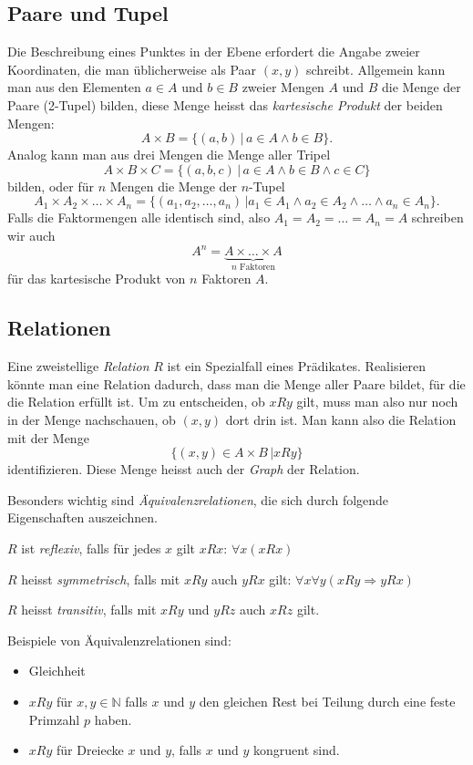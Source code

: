 \subsection{Paare und Tupel}
%
%
%
Die Beschreibung eines Punktes in der Ebene erfordert die Angabe zweier
Koordinaten, die man üblicherweise als Paar $(x,y)$ schreibt.
Allgemein
kann man aus den Elementen $a\in A$ und $b\in B$ zweier Mengen $A$ und $B$
die Menge der Paare (2-Tupel) bilden, diese Menge heisst das
{\em kartesische Produkt} der beiden Mengen:
\[
A\times B = \{(a,b)\,|\,a\in A\wedge b\in B\}.
\]
%
Analog kann man aus drei Mengen die Menge aller Tripel
\[
A\times B\times C=\{(a,b,c)\,|\,a\in A\wedge b\in B\wedge c\in C\}
\]
bilden, oder für $n$ Mengen die Menge der $n$-Tupel
\[
A_1\times A_2\times\dots\times A_n
=\{(a_1,a_2,\dots,a_n)\,|a_1\in A_1\wedge a_2\in A_2\wedge\dots\wedge a_n\in A_n\}.
\]
Falls die Faktormengen alle identisch sind, also $A_1=A_2=\dots=A_n=A$
schreiben wir auch
\[
A^n= \underbrace{A\times \dots \times A}_{\text{$n$ Faktoren}}
\]
für das kartesische Produkt von $n$ Faktoren $A$.

\subsection{Relationen}
%
Eine zweistellige {\em Relation} $R$ ist ein Spezialfall eines Prädikates.
Realisieren könnte man eine Relation dadurch, dass man die Menge
aller Paare bildet, für die die Relation erfüllt ist.
Um zu entscheiden,
ob $xRy$ gilt, muss man also nur noch in der Menge nachschauen,
ob $(x,y)$ dort drin ist.
Man kann also die Relation mit der
Menge
\[
\{(x,y)\in A\times B\,| xRy\}
\]
identifizieren.
%
Diese Menge heisst auch der {\em Graph} der Relation.

Besonders wichtig sind {\em Äquivalenzrelationen}, die sich durch folgende
Eigenschaften auszeichnen.
\begin{compactenum}
\item $R$ ist {\em reflexiv}, falls für jedes $x$ gilt $xRx$: $\forall x(xRx)$
\item $R$ heisst {\em symmetrisch}, falls mit $xRy$ auch $yRx$ gilt: $\forall x\forall y(xRy\Rightarrow yRx)$
\item $R$ heisst {\em transitiv}, falls mit $xRy$ und $yRz$ auch $xRz$ gilt.
\end{compactenum}
Beispiele von Äquivalenzrelationen sind:
\begin{itemize}
\item Gleichheit
\item $xRy$ für $x,y\in\mathbb N$ falls $x$ und $y$ den gleichen
Rest bei Teilung durch eine feste Primzahl $p$ haben.
\item $xRy$ für Dreiecke $x$ und $y$, falls $x$ und $y$ kongruent sind.
\end{itemize}

